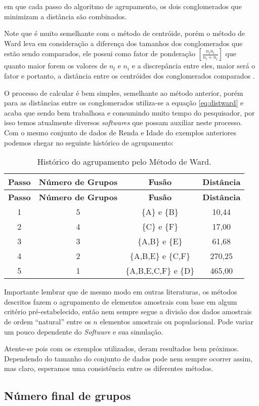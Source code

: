 \documentclass[
  openany]{book}
\begin{document}
em que cada passo do algoritmo de agrupamento, os dois conglomerados que minimizam a distância são combinados.

Note que é muito semelhante com o método de centróide, porém o método de Ward leva em consideração a diferença dos tamanhos dos conglomerados que estão sendo comparados, ele possui como fator de ponderação \([\frac{n_l n_i}{n_l+n_i}]\) que quanto maior forem os valores de \(n_l\) e \(n_i\) e a discrepância entre eles, maior será o fator e portanto, a distância entre os centróides dos conglomerados comparados \citep{mingoti2007analise}.

O processo de calcular é bem simples, semelhante ao método anterior, porém para as distâncias entre os conglomerados utiliza-se a equação \eqref{eq:distward} e acaba que sendo bem trabalhosa e consumindo muito tempo do pesquisador, por isso temos atualmente diversos \emph{softwares} que possam auxiliar neste processo. Com o mesmo conjunto de dados de Renda e Idade do exemplos anteriores podemos chegar no seguinte histórico de agrupamento:

\begin{longtable}[]{@{}cccc@{}}
\caption{\label{tab:ligward} Histórico do agrupamento pelo Método de Ward.}\tabularnewline
\toprule
\textbf{Passo} & \textbf{Número de Grupos} & \textbf{Fusão} & \textbf{Distância}\tabularnewline
\midrule
\endfirsthead
\toprule
\textbf{Passo} & \textbf{Número de Grupos} & \textbf{Fusão} & \textbf{Distância}\tabularnewline
\midrule
\endhead
1 & 5 & \{A\} e \{B\} & 10,44\tabularnewline
2 & 4 & \{C\} e \{F\} & 17,00\tabularnewline
3 & 3 & \{A,B\} e \{E\} & 61,68\tabularnewline
4 & 2 & \{A,B,E\} e \{C,F\} & 270,25\tabularnewline
5 & 1 & \{A,B,E,C,F\} e \{D\} & 465,00\tabularnewline
\bottomrule
\end{longtable}

Importante lembrar que de mesmo modo em outras literaturas, os métodos descritos fazem o agrupamento de elementos amostrais com base em algum critério pré-estabelecido, então nem sempre segue a divisão dos dados amostrais de ordem ``natural'' entre os \(n\) elementos amostrais ou populacional. Pode variar um pouco dependente do \emph{Software} e sua simulação.

Atente-se pois com os exemplos utilizados, deram resultados bem próximos. Dependendo do tamanho do conjunto de dados pode nem sempre ocorrer assim, mas claro, esperamos uma consistência entre os diferentes métodos.

\hypertarget{nuxfamero-final-de-grupos}{%
\subsection{Número final de grupos}\label{nuxfamero-final-de-grupos}}
\end{document}
